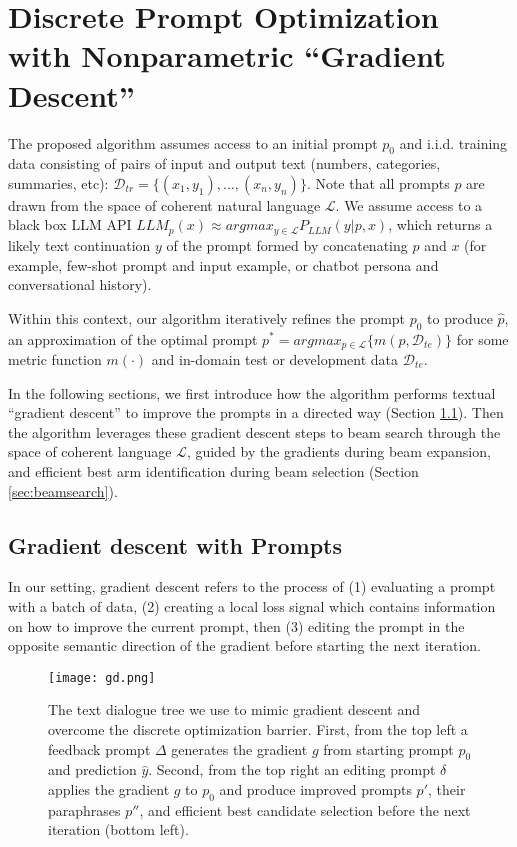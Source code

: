 \section{Discrete Prompt Optimization with Nonparametric ``Gradient Descent''}

The proposed algorithm assumes access to an initial prompt $p_0$ and i.i.d. training data consisting of pairs of input and output text (numbers, categories, summaries, etc): $\mathcal{D}_{tr} = \{(x_1, y_1), ..., (x_n, y_n)\}$. 
Note that all prompts $p$ are drawn from the space of coherent natural language $\mathcal{L}$.
We assume access to a black box LLM API $LLM_{p}(x) \approx argmax_{y \in \mathcal{L}} P_{LLM}(y \vert p, x)$, which returns a likely text continuation $y$ of the prompt formed by concatenating $p$ and $x$ (for example, few-shot prompt and input example, or chatbot persona and conversational history).

Within this context, our algorithm iteratively refines the prompt $p_0$ to produce $\hat{p}$, an approximation of the optimal prompt $p^* = argmax_{p\in \mathcal{L}} \{ m(p, \mathcal{D}_{te}) \}$ for some metric function $m(\cdot)$ and in-domain test or development data $\mathcal{D}_{te}$. 

In the following sections, we first introduce how the algorithm performs textual ``gradient descent'' to improve the prompts in a directed way (Section \ref{sec:graddescent}).
Then the algorithm leverages these gradient descent steps to beam search through the space of coherent language $\mathcal{L}$, guided by the gradients during beam expansion, and efficient best arm identification during beam selection (Section \ref{sec:beamsearch}). %

\subsection{Gradient descent with Prompts}
\label{sec:graddescent}
In our setting, gradient descent refers to the process of (1) evaluating a prompt with a batch of data, (2) creating a local loss signal which contains information on how to improve the current prompt, then (3) editing the prompt in the opposite semantic direction of the gradient before starting the next iteration. 

\begin{figure}
\centering
\texttt{[image: gd.png]}
\caption{The text dialogue tree we use to mimic gradient descent and overcome the discrete optimization barrier. First, from the top left a feedback prompt $\Delta$ generates the gradient $g$ from starting prompt $p_0$ and prediction $\hat{y}$. Second, from the top right an editing prompt $\delta$ applies the gradient $g$ to $p_0$ and produce improved prompts $p'$, their paraphrases $p''$, and efficient best candidate selection before the next iteration (bottom left).}
\label{fig:gd}
\end{figure}

